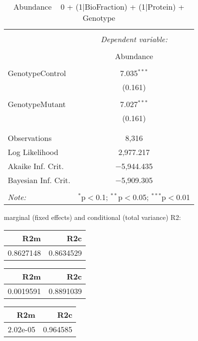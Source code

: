 \documentclass[11pt]{report}
\begin{document}
\begin{table}[!htbp] \centering 
  \caption{Abundance ~ 0 + (1|BioFraction) + (1|Protein) + Genotype} 
  \label{} 
\begin{tabular}{@{\extracolsep{5pt}}lc} 
\\[-1.8ex]\hline 
\hline \\[-1.8ex] 
 & \multicolumn{1}{c}{\textit{Dependent variable:}} \\ 
\cline{2-2} 
\\[-1.8ex] & Abundance \\ 
\hline \\[-1.8ex] 
 GenotypeControl & 7.035$^{***}$ \\ 
  & (0.161) \\ 
  & \\ 
 GenotypeMutant & 7.027$^{***}$ \\ 
  & (0.161) \\ 
  & \\ 
\hline \\[-1.8ex] 
Observations & 8,316 \\ 
Log Likelihood & 2,977.217 \\ 
Akaike Inf. Crit. & $-$5,944.435 \\ 
Bayesian Inf. Crit. & $-$5,909.305 \\ 
\hline 
\hline \\[-1.8ex] 
\textit{Note:}  & \multicolumn{1}{r}{$^{*}$p$<$0.1; $^{**}$p$<$0.05; $^{***}$p$<$0.01} \\ 
\end{tabular} 
\end{table} 
marginal (fixed effects) and conditional (total variance) R2:

\begin{tabular}{r|r}
\hline
R2m & R2c\\
\hline
0.8627148 & 0.8634529\\
\hline
\end{tabular}

\begin{tabular}{r|r}
\hline
R2m & R2c\\
\hline
0.0019591 & 0.8891039\\
\hline
\end{tabular}

\begin{tabular}{r|r}
\hline
R2m & R2c\\
\hline
2.02e-05 & 0.964585\\
\hline
\end{tabular}
\end{document}
